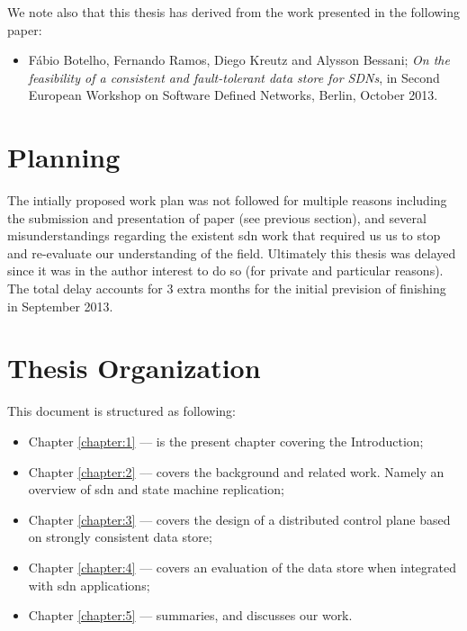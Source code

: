 We note also that this thesis has derived from the work presented in the following paper: 

\begin{itemize}
\item Fábio Botelho, Fernando Ramos, Diego Kreutz and Alysson Bessani; \emph{On the feasibility of a consistent and fault-tolerant data store for SDNs}, in Second European Workshop on Software Defined Networks, Berlin, October 2013. 
\end{itemize}

\section{Planning}
The intially proposed work plan was not followed for multiple reasons including the submission and presentation of paper (see previous section), and several misunderstandings regarding the existent \gls{sdn} work that required us us to stop and re-evaluate our understanding of the field. Ultimately this thesis was delayed since it was in the author interest to do so (for private and particular reasons). The total delay accounts  for 3 extra months for the initial prevision of finishing in September  2013. 

\section{Thesis Organization}

This document is structured as following: 
\begin{itemize}
\item Chapter \ref{chapter:1} –-- is the present chapter covering the Introduction;
\item Chapter \ref{chapter:2} –-- covers the background and related work. Namely an overview of \gls{sdn} and state machine replication; 
\item Chapter \ref{chapter:3} --- covers the design of a distributed control plane based on strongly consistent data store; 
\item Chapter \ref{chapter:4} --- covers an evaluation of the data store when integrated with \gls{sdn} applications; 
\item Chapter \ref{chapter:5} --- summaries, and discusses our work.  
\end{itemize}

